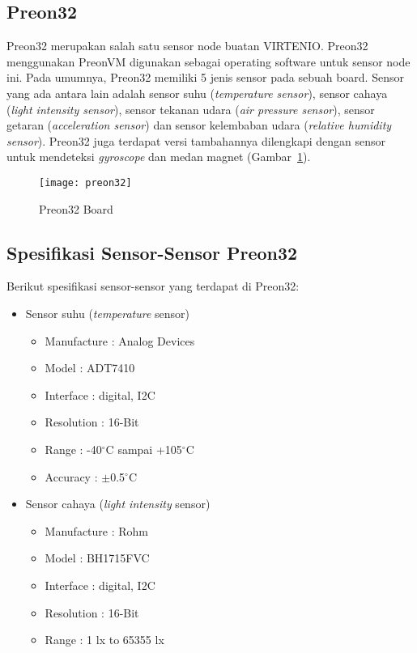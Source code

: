 \subsection{Preon32}
\label{preon32}
Preon32 merupakan salah satu sensor node buatan VIRTENIO. Preon32 menggunakan PreonVM digunakan sebagai operating software untuk sensor node ini.  Pada umumnya, Preon32 memiliki 5 jenis sensor pada sebuah board. Sensor yang ada antara lain adalah sensor suhu (\textit{temperature sensor}), sensor cahaya (\textit{light intensity sensor}), sensor tekanan udara (\textit{air pressure sensor}), sensor getaran (\textit{acceleration sensor}) dan sensor kelembaban udara (\textit{relative humidity sensor}). Preon32 juga terdapat versi tambahannya dilengkapi dengan sensor untuk mendeteksi \textit{gyroscope} dan medan magnet (Gambar~\ref{fig:preon32}).

\begin{figure}[H] 
		\centering  
		\texttt{[image: preon32]}  
		\caption[Preon32 Board]{Preon32 Board}
		\label{fig:preon32} 
\end{figure}

\subsection{Spesifikasi Sensor-Sensor Preon32}
Berikut spesifikasi sensor-sensor yang terdapat di Preon32:
\begin{itemize}
	\item Sensor suhu (\textit{temperature} sensor)
	\begin{itemize}
		\item Manufacture : Analog Devices
		\item Model : ADT7410
		\item Interface : digital, I2C
		\item Resolution : 16-Bit
		\item Range : -40$^{\circ}$C sampai +105$^{\circ}$C
		\item Accuracy : $\pm$0.5$^{\circ}$C
	\end{itemize}
\end{itemize}

\begin{itemize}
	\item Sensor cahaya (\textit{light intensity} sensor)
	\begin{itemize}
		\item Manufacture : Rohm
		\item Model : BH1715FVC
		\item Interface : digital, I2C
		\item Resolution : 16-Bit
		\item Range : 1 lx to 65355 lx
	\end{itemize}
\end{itemize}


